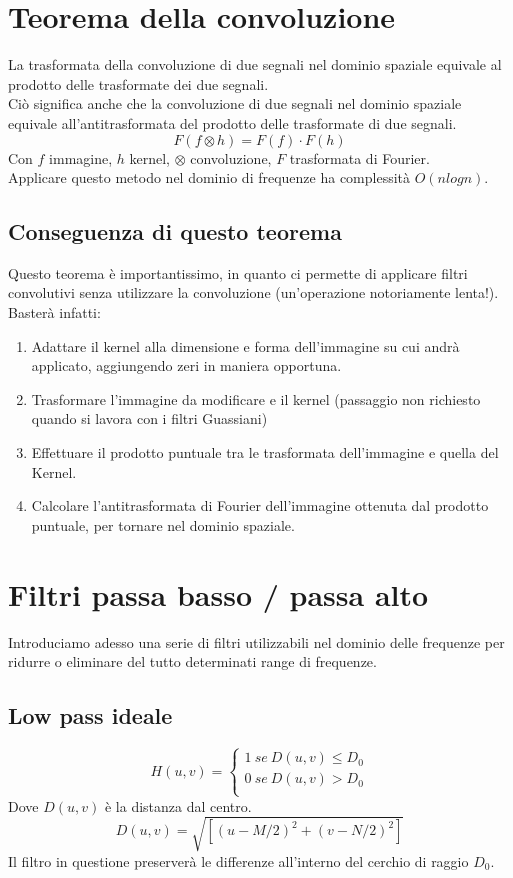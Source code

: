 \documentclass{report}
\begin{document}
	\section{Teorema della convoluzione}
	La trasformata della convoluzione di due segnali nel dominio spaziale equivale al prodotto delle trasformate dei due segnali.\\
	Ciò significa anche che la convoluzione di due segnali nel dominio spaziale equivale all'antitrasformata del prodotto delle trasformate di due segnali.
	$$
	F(f \otimes h) = F(f) \cdot F(h)
	$$
	Con $f$ immagine, $h$ kernel, $\otimes$ convoluzione, $F$ trasformata di Fourier.\\
	Applicare questo metodo nel dominio di frequenze ha complessità $O(nlogn)$.
	\subsection{Conseguenza di questo teorema}
	Questo teorema è importantissimo, in quanto ci permette di applicare filtri convolutivi senza utilizzare la convoluzione (un'operazione notoriamente lenta!).\\
	Basterà infatti:
	\begin{enumerate}
		\item Adattare il kernel alla dimensione e forma dell'immagine su cui andrà applicato, aggiungendo zeri in maniera opportuna.
		\item Trasformare l'immagine da modificare e il kernel (passaggio non richiesto quando si lavora con i filtri Guassiani)
		\item Effettuare il prodotto puntuale tra le trasformata dell'immagine e quella del Kernel.
		\item Calcolare l'antitrasformata di Fourier dell'immagine ottenuta dal prodotto puntuale, per tornare nel dominio spaziale.
	\end{enumerate}
	\section{Filtri passa basso / passa alto}
	Introduciamo adesso una serie di filtri utilizzabili nel dominio delle frequenze per ridurre o eliminare del tutto determinati range di frequenze.
	\subsection{Low pass ideale}
	$$
	H(u,v) = \begin{cases}
	1 \ se \ D(u,v) \leq D_0\\
	0 \ se \ D(u,v) > D_0\\
	\end{cases}
	$$
	Dove $D(u,v)$ è la distanza dal centro.
	$$
	D(u,v) = \sqrt{[(u-M/2)^2 + (v-N/2)^2]}
	$$
	Il filtro in questione preserverà le differenze all'interno del cerchio di raggio $D_0$.
\end{document}
